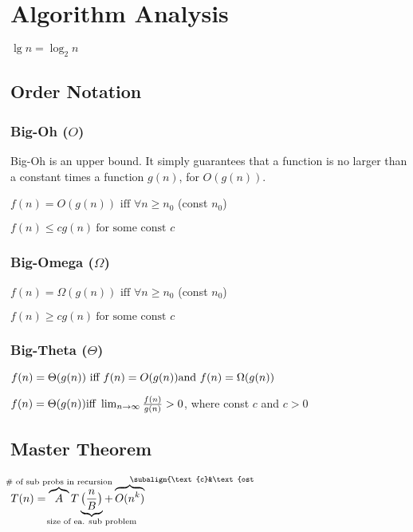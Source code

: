 \section{Algorithm Analysis}
{\scriptsize $\lg n=\log_2n$}
\subsection*{Order Notation}
\subsubsection*{Big-Oh ($O$)}
Big-Oh is an upper bound. It simply guarantees that a function is no larger than a constant times a function $g(n)$, for $O(g(n))$.

$f(n)=O(g(n))\textrm{ iff }\forall n\ge n_0$ \footnotesize{(const $n_0$)}

$f(n)\le cg(n)\ \textrm{for some const } c$

\subsubsection*{Big-Omega ($\Omega$)}
$f(n)=\Omega(g(n))\textrm{ iff }\forall n\ge n_0$ \footnotesize{(const $n_0$)}

$f(n)\ge cg(n)\ \textrm{for some const } c$

\subsubsection*{Big-Theta ($\Theta$)}
$f(n)=\Theta(g(n))\ \textrm{iff}\ f(n)=O(g(n))\\ \textrm{and}\ f(n)=\Omega(g(n))$

$f(n)=\Theta(g(n))\\%
\textrm{iff}\ \lim_{n\to\infty}\frac{f(n)}{g(n)}>0${\color{myblue},}
{\scriptsize\color{myblue}where const $c$ and $c>0$}

\subsection*{Master Theorem}
$T(n)=\overbrace{A}^{\mathclap{\textrm{\# of sub probs in recursion}}}T\underbrace{\bigl(\frac{n}{B}\bigr)}_{\mathclap{\textrm{size of ea. sub problem}}}%
+\overbrace{O(n^k)}^{\mathrlap{\subalign{\text{c}&\text{ost of work done}\\\text{o}&\text{ut of recursive call}}}}$

